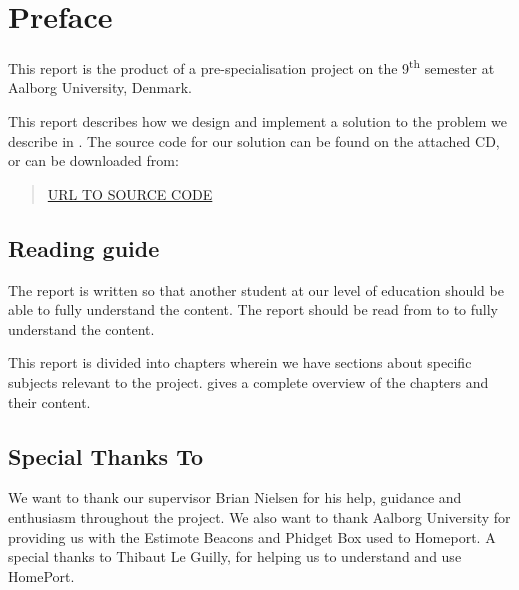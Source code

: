 \section*{Preface}\label{sec:preface}
This report is the product of a pre-specialisation project on the 9\textsuperscript{th} semester at Aalborg University, Denmark. 

This report describes how we design and implement a solution to the problem we describe in . 
The source code for our solution can be found on the attached CD, or can be downloaded from:
\begin{quote}
  \url{URL TO SOURCE CODE}
\end{quote}

\subsection*{Reading guide}
The report is written so that another student at our level of education should be able to fully understand the content. The report should be read from  to  to fully understand the content. 

This report is divided into chapters wherein we have sections about specific subjects relevant to the project.  gives a complete overview of the chapters and their content.

\subsection*{Special Thanks To}
We want to thank our supervisor Brian Nielsen for his help, guidance and enthusiasm throughout the project. We also want to thank Aalborg University for providing us with the Estimote Beacons and Phidget Box used to Homeport. A special thanks to Thibaut Le Guilly, for helping us to understand and use HomePort. 
